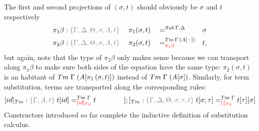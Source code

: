 \documentclass[a4paper,UKenglish,numberwithinsect,cleveref,thm-restate]{lipics-v2021}
\begin{document}
The first and second projections of $(\sigma, t)$ should obviously be $\sigma$ and $t$ respectively
\begin{alignat*}{5}
  \pi_1\beta      & : \implicit{\Gamma, \Delta, \Theta, \sigma, A, t}\; && \pi_1(\sigma , t)        && =^{\Sub\,\Gamma,\Delta} &&  \sigma \\
  \pi_2\beta      & : \implicit{\Gamma, \Delta, \Theta, \sigma, A, t}\; && \pi_2(\sigma , t)        && =^{\Tm\,\Gamma\,(\sub{A}{\blank})}_{\alert{\pi_1\beta}} &&  t, 
\end{alignat*}
but again, note that the type of $\pi_2\beta$ only makes sense because we can transport along $\pi_1\beta$ to make sure both sides of the equation have the same type: $\pi_2(\sigma, t)$ is an habitant of $\Tm\;\Gamma\;(\sub{A}{\pi_1\,(\sigma, t)})$ instead of $\Tm\;\Gamma\;(\sub{A}{\sigma})$.
%
Similarly, for term substitution, terms are transported along the corresponding rules:
\[
  [\idS]_{\Tm} : \implicit{\Gamma, A, t}\; {\sub{t}{\idS}} =^{\Tm\;\Gamma}_{\alert{[\idS]_\Ty}} t
  \qquad\qquad
  [;]_{\Tm}    : \implicit{\Gamma, \Delta, \Theta, \sigma, \tau, t}\; {\sub{t}{\sigma ; \tau}} =^{\Tm\;\Gamma}_{\alert{[;]_{\Ty}}}{\sub{\sub{t}{\tau}}{\sigma}}
\]
Constructors introduced so far complete the inductive definition of substitution calculus.
\end{document}
